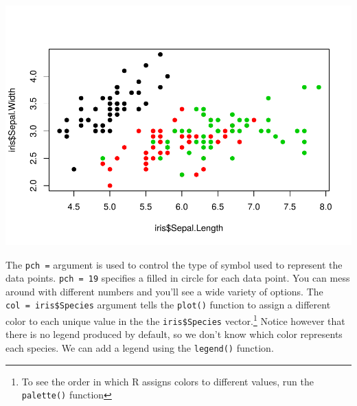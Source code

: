 \documentclass[
]{krantz}
\makeatletter
\newenvironment{Shaded}{\begin{snugshade}}{\end{snugshade}}
\newcommand{\DataTypeTok}[1]{\textcolor[rgb]{0.27,0.27,0.27}{#1}}
\newcommand{\DecValTok}[1]{\textcolor[rgb]{0.06,0.06,0.06}{#1}}
\newcommand{\FloatTok}[1]{\textcolor[rgb]{0.06,0.06,0.06}{#1}}
\newcommand{\KeywordTok}[1]{\textcolor[rgb]{0.27,0.27,0.27}{\textbf{#1}}}
\newcommand{\NormalTok}[1]{#1}
\newcommand{\OperatorTok}[1]{\textcolor[rgb]{0.43,0.43,0.43}{\textbf{#1}}}
\newcommand{\StringTok}[1]{\textcolor[rgb]{0.5,0.5,0.5}{#1}}
\newenvironment{kframe}{%
\medskip{}
\setlength{\fboxsep}{.8em}
 \def\at@end@of@kframe{}%
 \ifinner\ifhmode%
  \def\at@end@of@kframe{\end{minipage}}%
  \begin{minipage}{\columnwidth}%
 \fi\fi%
 \def\FrameCommand##1{\hskip\@totalleftmargin \hskip-\fboxsep
 \colorbox{shadecolor}{##1}\hskip-\fboxsep
     \hskip-\linewidth \hskip-\@totalleftmargin \hskip\columnwidth}%
 \MakeFramed {\advance\hsize-\width
   \@totalleftmargin\z@ \linewidth\hsize
   \@setminipage}}%
 {\par\unskip\endMakeFramed%
 \at@end@of@kframe}
\renewenvironment{Shaded}{\begin{kframe}}{\end{kframe}}
\makeatother
\begin{document}
\includegraphics{bookdown_files/figure-latex/unnamed-chunk-335-1.pdf}

The \texttt{pch\ =} argument is used to control the type of symbol used to represent the data points. \texttt{pch\ =\ 19} specifies a filled in circle for each data point. You can mess around with different numbers and you'll see a wide variety of options. The \texttt{col\ =\ iris\$Species} argument tells the \texttt{plot()} function to assign a different color to each unique value in the the \texttt{iris\$Species} vector.\footnote{To see the order in which R assigns colors to different values, run the \texttt{palette()} function} Notice however that there is no legend produced by default, so we don't know which color represents each species. We can add a legend using the \texttt{legend()} function.

\begin{Shaded}
\end{Shaded}
\end{document}
